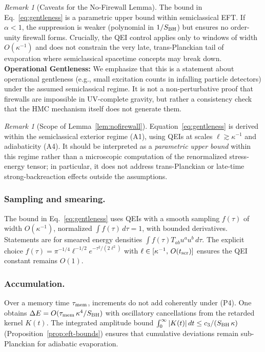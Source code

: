 \documentclass[11pt,a4paper]{article}
\theoremstyle{plain}
\theoremstyle{definition}
\theoremstyle{remark}
\newtheorem{remark}[theorem]{Remark}
\begin{document}
\begin{remark}[Caveats for the No-Firewall Lemma]
The bound in Eq.~\eqref{eq:gentleness} is a parametric upper bound within semiclassical EFT.
If $\alpha < 1$, the suppression is weaker (polynomial in $1/S_{\rm BH}$) but ensures no order-unity firewall forms.
Crucially, the QEI control applies only to windows of width $O(\kappa^{-1})$ and does not constrain the very late, trans-Planckian tail of evaporation where semiclassical spacetime concepts may break down.
\textbf{Operational Gentleness:} We emphasize that this is a statement about operational gentleness (e.g., small excitation counts in infalling particle detectors) under the assumed semiclassical regime. It is not a non-perturbative proof that firewalls are impossible in UV-complete gravity, but rather a consistency check that the HMC mechanism itself does not generate them.
\end{remark}

\begin{remark}[Scope of Lemma~\ref{lem:nofirewall}]
Equation~\eqref{eq:gentleness} is derived within the semiclassical exterior regime (A1), using QEIs at scales
$\ell\gtrsim\kappa^{-1}$ and adiabaticity (A4). It should be interpreted as a \emph{parametric upper bound} within
this regime rather than a microscopic computation of the renormalized stress-energy tensor; in particular, it does
not address trans-Planckian or late-time strong-backreaction effects outside the assumptions.
\end{remark}


\subsubsection{Sampling and smearing.}
The bound in Eq.~\eqref{eq:gentleness} uses QEIs with a smooth sampling $f(\tau)$ of width $O(\kappa^{-1})$,
normalized $\int f(\tau)\,d\tau=1$, with bounded derivatives. Statements are for smeared energy densities
$\int f(\tau) T_{ab}u^a u^b\,d\tau$. The explicit choice $f(\tau)=\pi^{-1/4}\ell^{-1/2}e^{-\tau^2/(2\ell^2)}$ with $\ell\in[\kappa^{-1},\,O(t_{\rm scr})]$ ensures the QEI constant remains $O(1)$.

\subsubsection{Accumulation.}
Over a memory time $\tau_{\rm mem}$, increments do not add coherently under (P4). One obtains
$\Delta E=O(\tau_{\rm mem}\,\kappa^4/S_{\rm BH})$ with oscillatory cancellations from the retarded kernel $K(t)$. The integrated amplitude bound $\int_0^\infty|K(t)|\,dt\le c_3/(S_{\rm BH}\,\kappa)$ (Proposition~\ref{prop:eft-bounds}) ensures that cumulative deviations remain sub-Planckian for adiabatic evaporation.
\end{document}

